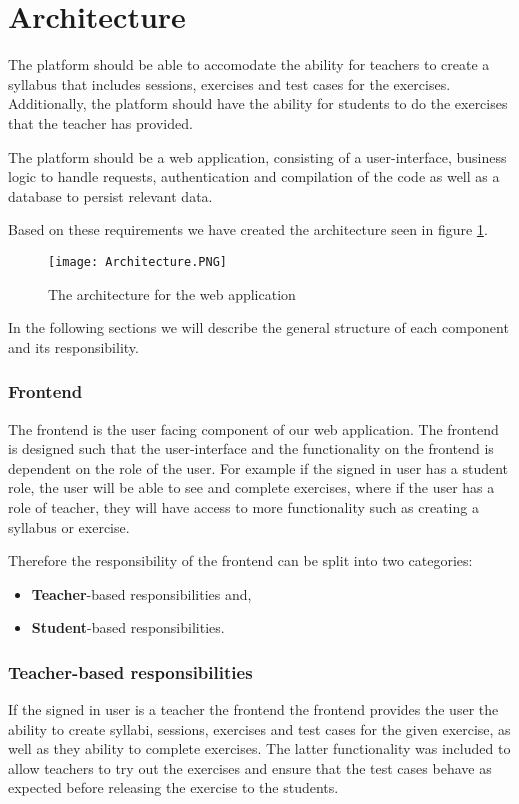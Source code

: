 \section{Architecture}
The platform should be able to accomodate the ability for teachers to create a syllabus that includes sessions, exercises and test cases for the exercises. Additionally, the platform should have the ability for students to do the exercises that the teacher has provided. 

The platform should be a web application, consisting of a user-interface, business logic to handle requests, authentication and compilation of the code as well as a database to persist relevant data.

Based on these requirements we have created the architecture seen in figure \ref{fig:Architecture}.

\begin{figure}[H]
	\texttt{[image: Architecture.PNG]}
	\centering
	\caption{The architecture for the web application}
	\label{fig:Architecture}
\end{figure}

In the following sections we will describe the general structure of each component and its responsibility.

\subsubsection{Frontend}
The frontend is the user facing component of our web application. The frontend is designed such that the user-interface and the functionality on the frontend is dependent on the role of the user. 
For example if the signed in user has a student role, the user will be able to see and complete exercises, where if the user has a role of teacher, they will have access to more functionality such as creating a syllabus or exercise.

Therefore the responsibility of the frontend can be split into two categories: 
\begin{itemize}
    \item \textbf{Teacher}-based responsibilities and,
    \item \textbf{Student}-based responsibilities.
\end{itemize}

\subsubsection*{Teacher-based responsibilities}
If the signed in user is a teacher the frontend the frontend provides the user the ability to create syllabi, sessions, exercises and test cases for the given exercise, as well as they ability to complete exercises. The latter functionality was included to allow teachers to try out the exercises and ensure that the test cases behave as expected before releasing the exercise to the students.

